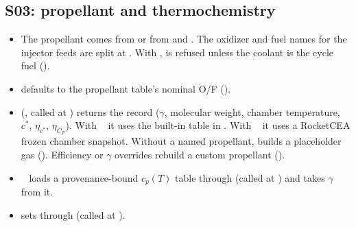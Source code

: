 \subsection{S03: propellant and thermochemistry}\label{sec:df-s03}
\begin{itemize}
  \item The propellant comes from  or from  and . The oxidizer and fuel names for the injector feeds are split at . With ,  is refused unless the coolant is the cycle fuel ().
  \item {} defaults to the propellant table's nominal O/F ().
  \item {} (, called at ) returns the  record ($\gamma$, molecular weight, chamber temperature, $c^*$, $\eta_{c^*}$, $\eta_{C_F}$). With ~ it uses the built-in table in . With ~ it uses a RocketCEA frozen chamber snapshot. Without a named propellant,  builds a placeholder gas (). Efficiency or $\gamma$ overrides rebuild a custom propellant ().
  \item {}~ loads a provenance-bound $c_p(T)$ table through  (called at ) and takes $\gamma$ from it.
  \item {} sets  through  (called at ).
\end{itemize}

